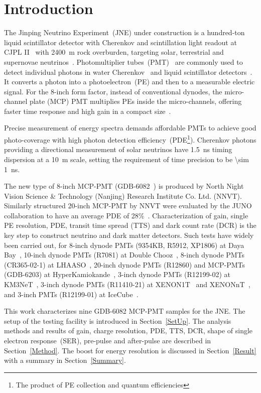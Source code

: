 \section{Introduction}
The Jinping Neutrino Experiment~(JNE) under construction is a hundred-ton liquid scintillator detector with Cherenkov and scintillation light readout
 at CJPL II~\cite{li_second-phase_2015,cheng_china_2017} with \SI{2400}{m} rock overburden, targeting solar, terrestrial and supernovae neutrinos~\cite{LetterJNE2017,xu_jinping_2020,xu_innovations_2022,xu_design_2022}.
Photomultiplier tubes~(PMT)~\cite{HAMAMATSUManual} are commonly used to detect individual photons in water Cherenkov~\cite{SNO,SuperK} and liquid scintillator detectors~\cite{KamLAND,JUNO:2015zny}. It converts a photon into a photoelectron~(PE) and then to a measurable electric signal.  For the 8-inch form factor, instead of conventional dynodes, the micro-channel plate (MCP) PMT multiplies PEs inside the micro-channels, offering faster time response and high gain in a compact size~\cite{WANG2012113,MCP-PMTworkgroup:2021hoy,HAMAMATSUManual}.

Precise measurement of energy spectra demands affordable PMTs to achieve good photo-coverage with high photon detection efficiency~(PDE\footnote{The product of PE collection and quantum efficiencies}). Cherenkov photons providing a directional measurement of solar neutrinos have \SI{1.5}{ns} timing dispersion at a \SI{10}{m} scale, setting the requirement of time precision to be \SI{\sim 1}{ns}.


The new type of 8-inch MCP-PMT (GDB-6082~\cite{GDB-6082}) is produced by North Night Vision Science \& Technology (Nanjing) Research Institute Co. Ltd. (NNVT). %
Similarly structured 20-inch MCP-PMT by NNVT were evaluated by the JUNO collaboration to have an average PDE of 28\%~\cite{JUNOMassTesting}.
Characterization of gain, single PE resolution, PDE, transit time spread (TTS) and dark count rate (DCR) is the key step to construct neutrino and dark matter detectors. Such tests have widely been carried out, for 8-inch dynode PMTs (9354KB, R5912, XP1806) at Daya Bay~\cite{DayaBayTesting}, 10-inch dynode PMTs (R7081) at Double Chooz~\cite{DoubleChoozeTesting}, 8-inch dynode PMTs (CR365-02-1) at LHAASO~\cite{LHAASOTesting}, 20-inch dynode PMTs (R12860) and MCP-PMTs (GDB-6203) at HyperKamiokande~\cite{HyperKTesting}, 3-inch dynode PMTs (R12199-02) at KM3NeT~\cite{KM3NetTesting}, 3-inch dynode PMTs (R11410-21) at XENON1T~\cite{XENON1TTesting} and XENONnT~\cite{XENONnTTesting}, and 3-inch PMTs (R12199-01) at IceCube~\cite{IceCubeTesting}.

This work characterizes nine GDB-6082 MCP-PMT samples for the JNE.  The setup of the testing facility is introduced in Section~\ref{SetUp}. The analysis methods and results of gain, charge resolution, PDE, TTS, DCR, shape of single electron response~(SER), pre-pulse and after-pulse are described in Section~\ref{Method}. The boost for energy resolution is discussed in Section~\ref{Result} with a summary in Section~\ref{Summary}.
